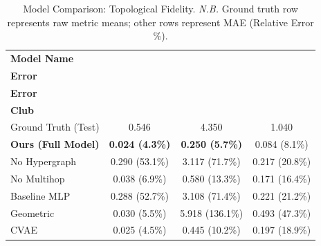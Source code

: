 \documentclass[sigconf, review]{acmart}
\begin{document}

\begin{table}[h]
\caption{Model Comparison: Topological Fidelity. 
\textit{N.B.} Ground truth row represents raw metric means; other rows represent MAE (Relative Error \%).}
\label{tab:local_topology}
\centering
\renewcommand{\arraystretch}{1.3}
\begin{tabular}{lccc}
\toprule
\textbf{Model Name} & \shortstack{\textbf{Clust.} \\ \textbf{Error}} & \shortstack{\textbf{Sigma} \\ \textbf{Error}} & \shortstack{\textbf{Rich} \\ \textbf{Club} }(Rel. \%)\\ 
\midrule
Ground Truth (Test) & 0.546 & 4.350 & 1.040\\ 
\midrule
\textbf{Ours (Full Model)} & \textbf{0.024 (4.3\%)} & \textbf{0.250 (5.7\%)} & 0.084 (8.1\%)\\
\midrule
No Hypergraph & 0.290 (53.1\%) & 3.117 (71.7\%) & 0.217 (20.8\%)\\
No Multihop & 0.038 (6.9\%) & 0.580 (13.3\%) & 0.171 (16.4\%)\\
Baseline MLP & 0.288 (52.7\%) & 3.108 (71.4\%) & 0.221 (21.2\%)\\
\midrule
Geometric \cite{betzel_generative_2016} & 0.030 (5.5\%) & 5.918 (136.1\%) & 0.493 (47.3\%)\\
CVAE \cite{liu_deep_2025} & 0.025 (4.5\%) & 0.445 (10.2\%) & 0.197 (18.9\%)\\
\bottomrule
\end{tabular}
\end{table}
\end{document}
